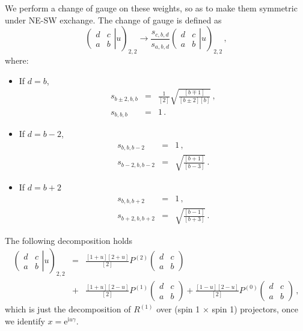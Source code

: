 \documentclass[11pt]{article}
\begin{document}
We perform a change of gauge on these weights, so as to make them symmetric under NE-SW exchange. 
The change of gauge is defined as 
\begin{equation}
  \left. \left( \begin{array}{cc} d & c \\ a & b \end{array} \right| u  \right)_{2,2} \to  \frac{s_{c,b,d}}{s_{a,b,d}}  \left. \left( \begin{array}{cc} d & c \\ a & b \end{array} \right| u  \right)_{2,2} \,,
\label{eq:gaugeRSOS}
  \end{equation}
where:
\begin{itemize}
 \item If $d=b$,
 \begin{eqnarray}
  s_{b\pm2, b, b} &=& \frac{1}{[2]} \sqrt{\frac{[b\mp 1]}{[b\pm 2][b]}} \,, \\ 
  s_{b,b,b} &=& 1 \,.
 \end{eqnarray}
 \item If $d=b-2$,
 \begin{eqnarray}
  s_{b,b,b-2} &=& 1 \,, \\ 
  s_{b-2,b,b-2} &=& \sqrt{\frac{[b+1]}{[b-3]}} \,.
 \end{eqnarray}
  \item If $d=b+2$
 \begin{eqnarray}
  s_{b,b,b+2} &=& 1 \,, \\ 
  s_{b+2,b,b+2} &=& \sqrt{\frac{[b-1]}{[b+3]}} \,.
 \end{eqnarray}
\end{itemize}

The following decomposition holds
%
\begin{eqnarray} 
 \left. \left( \begin{array}{cc} d & c \\ a & b \end{array} \right| u  \right)_{2,2} &=& 
 \frac{[1+u][2+u]}{[2]} P^{(2)}\left( \begin{array}{cc} d & c \\ a & b \end{array} \right) \nonumber \\
 &+&  \frac{[1+u][2-u]}{[2]} P^{(1)}\left( \begin{array}{cc} d & c \\ a & b \end{array} \right) 
 +  \frac{[1-u][2-u]}{[2]} P^{(0)}\left( \begin{array}{cc} d & c \\ a & b \end{array} \right) \,,
\end{eqnarray}
%
which is just the decomposition of $R^{(1)}$ over (spin 1 $\times$ spin 1) projectors, once we identify $x = \mathrm{e}^{\mathrm{i} u \gamma}$.
\end{document}
